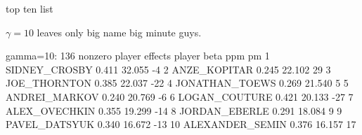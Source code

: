 \documentclass[11pt,xcolor=svgnames]{beamer}
\newcommand{\theme}{\color{Maroon}}
\newcommand{\gr}{\color{black!60}}
\newcommand{\nv}{\color{Navy}}
\begin{document}
\begin{frame}[fragile]{top ten list}

$\gamma=10$ leaves only big name big minute guys.

\begin{semiverbatim}\nv{}
 gamma=10: 136 nonzero player effects
             player  beta    ppm  pm
 1    SIDNEY_CROSBY 0.411 32.055  -4
 2     ANZE_KOPITAR 0.245 22.102  29
 3     JOE_THORNTON 0.385 22.037 -22
 4   JONATHAN_TOEWS 0.269 21.540   5
 5    ANDREI_MARKOV 0.240 20.769  -6
 6    LOGAN_COUTURE 0.421 20.133 -27
 7    ALEX_OVECHKIN 0.355 19.299 -14
 8    JORDAN_EBERLE 0.291 18.084   9
 9    PAVEL_DATSYUK 0.340 16.672 -13
 10 ALEXANDER_SEMIN 0.376 16.157  17
\end{semiverbatim}

\end{frame}

\end{document}
